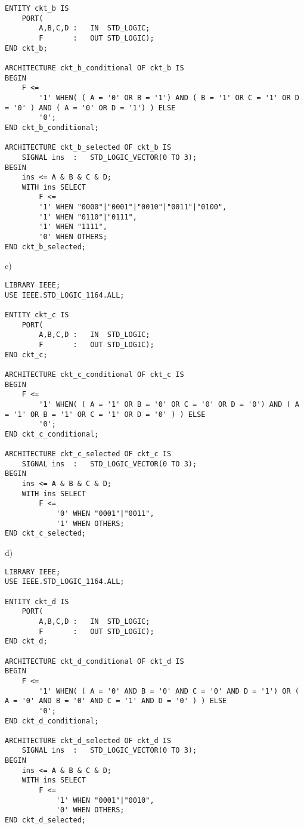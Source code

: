 \begin{enumerate}
\begin{minipage}{1\linewidth}
\begin{lstlisting}
ENTITY ckt_b IS
	PORT(
		A,B,C,D	:	IN	STD_LOGIC;
		F		:	OUT	STD_LOGIC);
END ckt_b;

ARCHITECTURE ckt_b_conditional OF ckt_b IS
BEGIN
	F <=
		'1' WHEN( ( A = '0' OR B = '1') AND ( B = '1' OR C = '1' OR D = '0' ) AND ( A = '0' OR D = '1') ) ELSE
		'0';
END ckt_b_conditional;

ARCHITECTURE ckt_b_selected OF ckt_b IS
	SIGNAL ins	:	STD_LOGIC_VECTOR(0 TO 3);
BEGIN
	ins <= A & B & C & D;
	WITH ins SELECT
		F <=
		'1' WHEN "0000"|"0001"|"0010"|"0011"|"0100",
		'1' WHEN "0110"|"0111",
		'1' WHEN "1111",
		'0' WHEN OTHERS;
END ckt_b_selected;
		\end{lstlisting}
	\end{minipage}

	\begin{minipage}{1\linewidth}
		c)
		\begin{lstlisting}
LIBRARY IEEE;
USE IEEE.STD_LOGIC_1164.ALL;

ENTITY ckt_c IS
	PORT(
		A,B,C,D	:	IN	STD_LOGIC;
		F		:	OUT	STD_LOGIC);
END ckt_c;

ARCHITECTURE ckt_c_conditional OF ckt_c IS
BEGIN
	F <=
		'1' WHEN( ( A = '1' OR B = '0' OR C = '0' OR D = '0') AND ( A = '1' OR B = '1' OR C = '1' OR D = '0' ) ) ELSE
		'0';
END ckt_c_conditional;

ARCHITECTURE ckt_c_selected OF ckt_c IS
	SIGNAL ins	:	STD_LOGIC_VECTOR(0 TO 3);
BEGIN
	ins <= A & B & C & D;
	WITH ins SELECT
		F <=
			'0' WHEN "0001"|"0011",
			'1' WHEN OTHERS;
END ckt_c_selected;
		\end{lstlisting}
	\end{minipage}

	\begin{minipage}{1\linewidth}
		d)
		\begin{lstlisting}
LIBRARY IEEE;
USE IEEE.STD_LOGIC_1164.ALL;

ENTITY ckt_d IS
	PORT(
		A,B,C,D	:	IN	STD_LOGIC;
		F		:	OUT	STD_LOGIC);
END ckt_d;

ARCHITECTURE ckt_d_conditional OF ckt_d IS
BEGIN
	F <=
		'1' WHEN( ( A = '0' AND B = '0' AND C = '0' AND D = '1') OR ( A = '0' AND B = '0' AND C = '1' AND D = '0' ) ) ELSE
		'0';
END ckt_d_conditional;

ARCHITECTURE ckt_d_selected OF ckt_d IS
	SIGNAL ins	:	STD_LOGIC_VECTOR(0 TO 3);
BEGIN
	ins <= A & B & C & D;
	WITH ins SELECT
		F <=
			'1' WHEN "0001"|"0010",
			'0' WHEN OTHERS;
END ckt_d_selected;
		\end{lstlisting}
	\end{minipage}


\end{enumerate}
